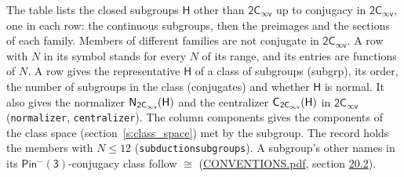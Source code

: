 \documentclass[10pt,a4paper]{article}
\numberwithin{equation}{section}
\newcommand{\grp}[1]{\mathsf{#1}}
\newcommand{\samecls}{\cong}
\newcommand{\hairsp}{\mkern1mu}
\begin{document}
\leavevmode\label{n:group.H}The table lists the closed subgroups $\grp{H}$ other than $\grp{2C_{\infty v}}$ up to conjugacy in $\grp{2C_{\infty v}}$, one in each row: the continuous subgroups, then the preimages and the sections of each family. Members of different families are not conjugate in $\grp{2C_{\infty v}}$. A row with $N$ in its symbol stands for every $N$ of its range, and its entries are functions of $N$. \label{n:head.subgroup}\label{n:head.order}\label{n:head.conjugates}\label{n:head.normal}A row gives the representative $\grp{H}$ of a class of subgroups (subgrp), its order, the number of subgroups in the class (conjugates) and whether $\grp{H}$ is normal. \label{n:group.normalizer}\label{n:group.centralizer}It also gives the normalizer $\grp{N}_{\hairsp \grp{2C_{\infty v}}}(\grp{H})$ and the centralizer $\grp{C}_{\hairsp \grp{2C_{\infty v}}}(\grp{H})$ in $\grp{2C_{\infty v}}$ (\texttt{normalizer}, \texttt{centralizer}). \label{n:head.components}The column components gives the components of the class space (section~\ref{s:class_space}) met by the subgroup. The record holds the members with $N \le 12$ (\texttt{subductionsubgroups}). A subgroup's other names in its \href{Pinminus3.pdf}{$\grp{Pin^{-}(3)}$}-conjugacy class follow $\samecls$ (\href{../../CONVENTIONS.pdf}{CONVENTIONS.pdf}, section \href{../../CONVENTIONS.pdf\#conv.20.2}{20.2}).
\end{document}
